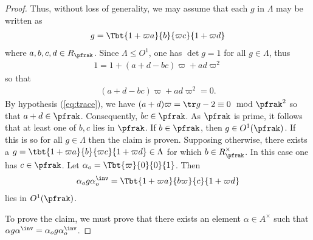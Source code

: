 \begin{proof}
	Thus, without loss of generality, we may assume that each $g$ in $\Lambda$ may be written as
	\begin{align*}
		g = \Tbt{1+\varpi a}{b}{\varpi c}{1+\varpi d}
	\end{align*}
	where $a,b,c,d \in R_\pfrak$.
	Since $\Lambda \leq O^1$, one has $\det g = 1 $ for all $g\in \Lambda$, thus
	\begin{align*}
		1 = 1 + (a+d - bc) \varpi + ad \varpi^2
	\end{align*}
	so that
	\begin{align}\label{eq:MandarinLeyden}
		(a+d - bc) \varpi + ad \varpi^2 =0.
	\end{align}
	By hypothesis (\ref{eq:trace}), we have $(a+d)\varpi = \tr g -2 \equiv 0 \mod \pfrak^2$ so that $a+d \in \pfrak$. Consequently, $bc \in \pfrak$. As $\pfrak$ is prime, it follows that at least one of $b,c$ lies in $\pfrak$. If $b \in \pfrak$, then $g \in O^1(\pfrak)$. If this is so for all $g \in \Lambda$ then the claim is proven. Supposing otherwise, there exists a $g=\tbt{1+\varpi a}{b}{\varpi c}{1+\varpi d} \in \Lambda$ for which $b \in R_\pfrak^\times$. In this case one has $c \in \pfrak$. Let $\alpha_o = \Tbt{\varpi}{0}{0}{1}$. Then
	\begin{align*}
		\alpha_o g\alpha_o^\inv  = \Tbt{1+\varpi a}{b\varpi}{c}{1+\varpi d}
	\end{align*}
	lies in $O^1(\pfrak)$.


	To prove the claim, we must prove that there exists an element $\alpha \in A^\times $ such that $\alpha g \alpha^\inv =  \alpha_o g \alpha_o^\inv$.














\end{proof}